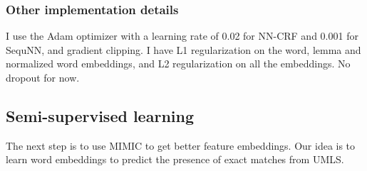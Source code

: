 \documentclass[10pt,a4paper]{article}
\begin{document}
\subsubsection{Other implementation details}

I use the Adam optimizer with a learning rate of 0.02 for NN-CRF and 0.001 for SequNN, and gradient clipping. I have L1 regularization on the word, lemma and normalized word embeddings, and L2 regularization on all the embeddings. No dropout for now.

\subsection{Semi-supervised learning}

The next step is to use MIMIC to get better feature embeddings. Our idea is to learn word embeddings to predict the presence of exact matches from UMLS.

\nocite{*}
{}

\end{document}
